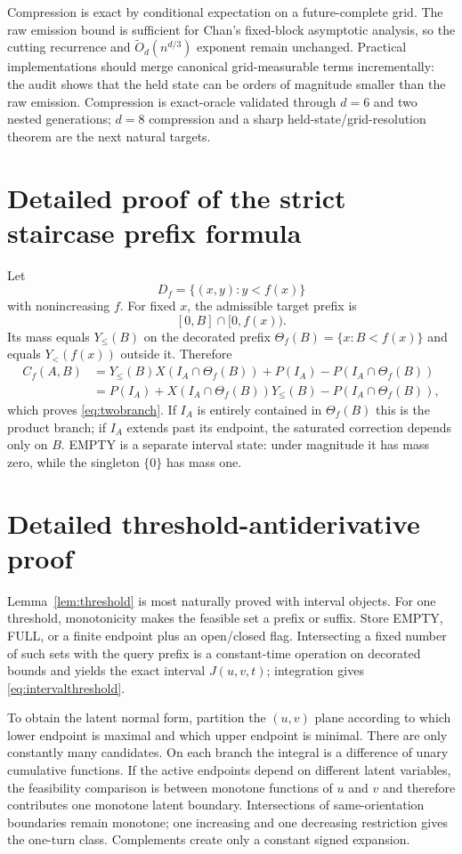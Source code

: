 \documentclass[12pt,a4paper]{article}
\theoremstyle{definition}
\newcommand{\1}{\mathbf 1}
\begin{document}
Compression is exact by conditional expectation on a future-complete grid. The raw emission bound is sufficient for Chan's fixed-block asymptotic analysis, so the cutting recurrence and $\widetilde O_d(n^{d/3})$ exponent remain unchanged. Practical implementations should merge canonical grid-measurable terms incrementally: the audit shows that the held state can be orders of magnitude smaller than the raw emission. Compression is exact-oracle validated through $d=6$ and two nested generations; $d=8$ compression and a sharp held-state/grid-resolution theorem are the next natural targets.

\section{Detailed proof of the strict staircase prefix formula}       \label{app:twobranch}

Let
\[
D_f=\{(x,y):y<f(x)\}
\]
with nonincreasing $f$.  For fixed $x$, the admissible target prefix is
\[
[0,B]\cap[0,f(x)).
\]
Its mass equals $Y_{\le}(B)$ on the decorated prefix $\Theta_f(B)=\{x:B<f(x)\}$ and equals $Y_{<}(f(x))$ outside it.  Therefore
\[
\begin{aligned}
C_f(A,B)
&=Y_{\le}(B)X(I_A\cap\Theta_f(B))
  +P(I_A)-P(I_A\cap\Theta_f(B))\\
&=P(I_A)+X(I_A\cap\Theta_f(B))Y_{\le}(B)
  -P(I_A\cap\Theta_f(B)),
\end{aligned}
\]
which proves \eqref{eq:twobranch}.  If $I_A$ is entirely contained in $\Theta_f(B)$ this is the product branch; if $I_A$ extends past its endpoint, the saturated correction depends only on $B$.  EMPTY is a separate interval state: under magnitude it has mass zero, while the singleton $\{0\}$ has mass one.

\section{Detailed threshold-antiderivative proof}                  \label{app:thresholdproof}

Lemma~\ref{lem:threshold} is most naturally proved with interval objects.  For one threshold, monotonicity makes the feasible set a prefix or suffix.  Store EMPTY, FULL, or a finite endpoint plus an open/closed flag.  Intersecting a fixed number of such sets with the query prefix is a constant-time operation on decorated bounds and yields the exact interval $J(u,v,t)$; integration gives \eqref{eq:intervalthreshold}.

To obtain the latent normal form, partition the $(u,v)$ plane according to which lower endpoint is maximal and which upper endpoint is minimal.  There are only constantly many candidates.  On each branch the integral is a difference of unary cumulative functions.  If the active endpoints depend on different latent variables, the feasibility comparison is between monotone functions of $u$ and $v$ and therefore contributes one monotone latent boundary.  Intersections of same-orientation boundaries remain monotone; one increasing and one decreasing restriction gives the one-turn class.  Complements create only a constant signed expansion.
\end{document}
